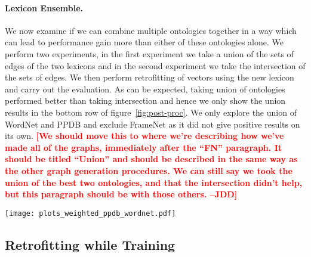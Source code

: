 \documentclass[11pt]{article}
\newcommand{\jdd}[1]{\textcolor{red}{\bf\small [#1 --JDD]}}
\begin{document}
\paragraph{Lexicon Ensemble.} We now examine if we can combine multiple ontologies
together in a way which can lead to performance gain more than either of these ontologies alone.
We perform two experiments, in the first experiment we take a union of the sets of edges 
of the two lexicons and in the second experiment we take the intersection of the
sets of edges.
We then perform retrofitting of vectors using the new lexicon and carry out the evaluation.
As can be expected, taking union of ontologies performed better than taking 
intersection and hence we only show the union results in the bottom 
row of figure~\ref{fig:post-proc}. We only explore the union of WordNet and 
PPDB and exclude FrameNet as it did not give positive results on its own. \jdd{We should move this to where we're describing how we've made all of the graphs, immediately after the ``FN'' paragraph.  It should be titled ``Union'' and should be described in the same way as the other graph generation procedures. We can still say we took the union of the best two ontologies, and that the intersection didn't help, but this paragraph should be with those others.}

\begin{figure*}[!tb]
  \centering
  \texttt{[image: plots\_weighted\_ppdb\_wordnet.pdf]}
  \caption{Absolute improvement in  Spearman's correlation ratio (3 left columns) and accuracy (3 right 
  columns) using different semantic lexicons on different tasks. \jdd{Comparing vertically shows which ontologies perform better. }}
  \label{fig:post-proc}
\end{figure*}

\subsection{Retrofitting while Training}
\label{sec:improve-tr}
\end{document}
